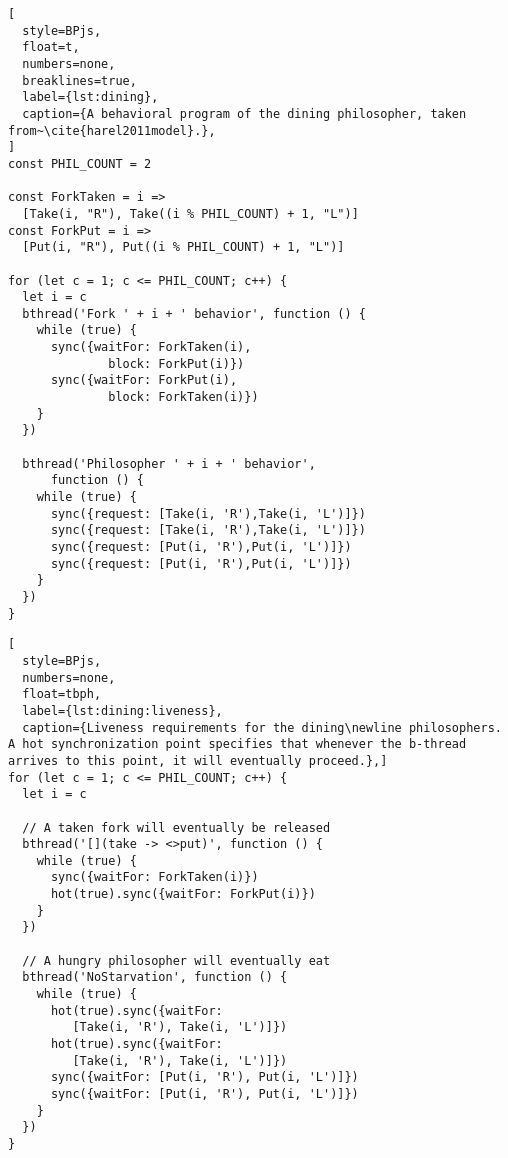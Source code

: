 \documentclass[10pt,journal,compsoc]{IEEEtran}
\theoremstyle{definition}
\begin{document}
\begin{figure*}
\centering
{}
\caption{The PN model of~\cite{workcraftDinning} for the dining philosophers problem.}
\label{fig:dining-philosophers}
\end{figure*}

\begin{lstlisting}[
  style=BPjs,
  float=t,
  numbers=none,
  breaklines=true,
  label={lst:dining},
  caption={A behavioral program of the dining philosopher, taken from~\cite{harel2011model}.},
]
const PHIL_COUNT = 2

const ForkTaken = i => 
  [Take(i, "R"), Take((i % PHIL_COUNT) + 1, "L")]
const ForkPut = i => 
  [Put(i, "R"), Put((i % PHIL_COUNT) + 1, "L")]

for (let c = 1; c <= PHIL_COUNT; c++) {
  let i = c
  bthread('Fork ' + i + ' behavior', function () {
    while (true) {
      sync({waitFor: ForkTaken(i), 
              block: ForkPut(i)})
      sync({waitFor: ForkPut(i), 
              block: ForkTaken(i)})
    }
  })

  bthread('Philosopher ' + i + ' behavior', 
      function () {
    while (true) {
      sync({request: [Take(i, 'R'),Take(i, 'L')]})
      sync({request: [Take(i, 'R'),Take(i, 'L')]})
      sync({request: [Put(i, 'R'),Put(i, 'L')]})
      sync({request: [Put(i, 'R'),Put(i, 'L')]})
    }
  })
}
\end{lstlisting}

\begin{lstlisting}[
  style=BPjs,
  numbers=none,
  float=tbph,
  label={lst:dining:liveness},
  caption={Liveness requirements for the dining\newline philosophers. A hot synchronization point specifies that whenever the b-thread arrives to this point, it will eventually proceed.},]
for (let c = 1; c <= PHIL_COUNT; c++) {
  let i = c

  // A taken fork will eventually be released
  bthread('[](take -> <>put)', function () {
    while (true) {
      sync({waitFor: ForkTaken(i)})
      hot(true).sync({waitFor: ForkPut(i)})
    }
  })

  // A hungry philosopher will eventually eat
  bthread('NoStarvation', function () {
    while (true) {
      hot(true).sync({waitFor: 
         [Take(i, 'R'), Take(i, 'L')]})
      hot(true).sync({waitFor: 
         [Take(i, 'R'), Take(i, 'L')]})
      sync({waitFor: [Put(i, 'R'), Put(i, 'L')]})
      sync({waitFor: [Put(i, 'R'), Put(i, 'L')]})
    }
  })
}
\end{lstlisting}
\end{document}
